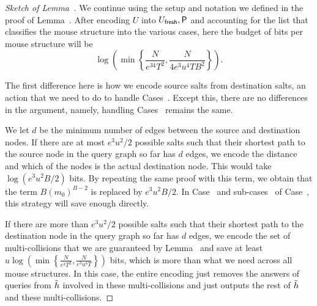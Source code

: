\begin{proof}[Sketch of Lemma~]
We continue using the setup and notation we defined in the proof of Lemma~. After encoding $U$ into $U_\textsf{fresh},\mathsf{P}$ and accounting for the list that classifies the mouse structure into the various cases, here the budget of bits per mouse structure will be $$\log \left(\min\left\{\frac{N}{e^34T^2},\frac{N}{4e^3u^4TB^2}\right\}\right).$$

The first difference here is how we encode source salts from destination salts, an action that we need to do to handle Cases~. Except this, there are no differences in the argument, namely, handling Cases~ remains the same.

We let $d$ be the minimum number of edges between the source and destination nodes. If there are at most $e^3u^2/2$ possible salts such that their shortest path to the source node in the query graph so far has $d$ edges, we encode the distance and which of the nodes is the actual destination node. This would take $\log (e^3u^2B/2)$ bits. By repeating the same proof with this term, we obtain that the term $B(m_0)^{B-2}$ is replaced by $e^3u^2B/2$. In Case~ and sub-cases~ of Case~, this  strategy will save enough directly.

If there are more than $e^3u^2/2$ possible salts such that their shortest path to the destination node in the query graph so far has $d$ edges, we encode the set of multi-collisions that we are guaranteed by Lemma~ and save at least $
u \log\left(\min\left\{\frac{N}{e^3T^2},\frac{N}{e^3u^4T}\right\}\right)$ bits, which is more than what we need across all mouse structures. In this case, the entire encoding just removes the answers of queries from $\tilde{h}$ involved in these multi-collisions and just outputs the rest of $\tilde{h}$ and these multi-collisions. 
\fi

\newcommand{\subcasesix}{
\ifnum\eprintversion=1\heading{Handling sub-cases~\labelcref{case:norepc,case:norepd} of Case~\labelcref{case:norep}.} \fi For sub-cases~\labelcref{case:norepc,case:norepd} of Case~\labelcref{case:norep}, if we use the new strategy to encode the destination nodes, we might not save enough. We explain why this is the case. Recall that in sub-case~\labelcref{case:norepc} of Case~\labelcref{case:norep}, per mouse structure, our savings was
\[\log \frac{N}{T^2} +\log \frac{N}{uTB^2m_0^{2(B-2)}}\] bits. Now, when we replace $Bm_0^{B-2}$ with $e^3u^2B/2$, the per mouse structure savings is 
\[\log \frac{N}{T^2} +\log \frac{N}{e^3u^5TB^2}\]
bits. 
For our current budget, this is not enough. To accommodate this, we could increase our budget per mouse structure by replacing the $u^4$ term with a $u^5$ term.\footnote{This would result in an $S^5$ term in the total upper bound on the advantage of the attacker. Our improved compression strategy gives an $S^4$ term.} But, by slightly modifying the encoding/decoding procedures, we can use the allocated budget.

}
\end{proof}
